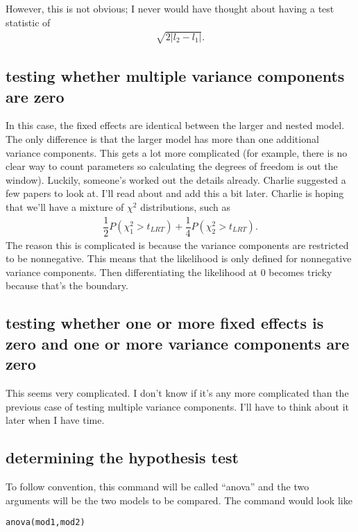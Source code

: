 \documentclass{article}
\begin{document}
 However, this is not obvious; I never would have thought about having a test statistic of
 \begin{align}
 \sqrt{2 | l_2-l_1   |   }.
 \end{align}
 
 \subsection{testing whether multiple variance components are zero}
 In this case, the fixed effects are identical between the larger and nested model. The only difference is that the larger model has more than one additional variance components. This gets a lot more complicated (for example, there is no clear way to count parameters so calculating the degrees of freedom is out the window). Luckily, someone's worked out the details already. Charlie suggested a few papers to look at. I'll read about and add this a bit later.  Charlie is hoping that we'll have a mixture of $\chi^2$ distributions, such as
 \begin{align}
 \dfrac{1}{2}P (\chi^2_1> t_{LRT}) +\dfrac{1}{4}P (\chi^2_2> t_{LRT}).
 \end{align}
 The reason this is complicated is because the variance components are restricted to be nonnegative. This means that the likelihood is only defined for nonnegative variance components. Then differentiating the likelihood at $0$ becomes tricky because that's the boundary.

 \subsection{testing whether one or more fixed effects is zero and one or more variance components are zero}\label{sec:combotest}
 This seems very complicated. I don't know if it's any more complicated than the previous case of testing multiple variance components. I'll have to think about it later when I have time.
 
 \subsection{determining the hypothesis test}
 To follow convention, this command will be called ``anova'' and the two arguments will be the two models to be compared.  The command would look like
\begin{verbatim}
anova(mod1,mod2)
\end{verbatim} 
\end{document}
